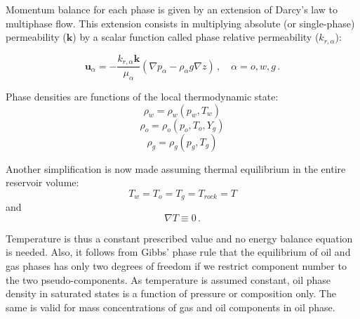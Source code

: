 \documentclass[authoryear,preprint,review,12pt]{elsarticle}
\begin{document}
%

Momentum balance for each phase is given by an extension of Darcy's law to multiphase flow. This extension consists in multiplying absolute (or single-phase) permeability ($\mathbf{k}$) by a scalar function called phase relative permeability ($k_{r,\alpha}$):

\begin{equation}\label{eq: exdarcy}
\mathbf{u}_\alpha = -\frac{k_{r,\alpha} \mathbf{k}}{\mu_\alpha} \left(\nabla p_\alpha - \rho_\alpha g\nabla z\right) \, , \quad \alpha=o,w,g \, .
\end{equation}

Phase densities are functions of the local thermodynamic state:
\begin{equation}
\rho_w = \rho_w \left(p_w, T_w\right)
\end{equation}
\begin{equation}
\rho_o = \rho_o \left(p_o, T_o,Y_g\right)
\end{equation}
\begin{equation}
\rho_g = \rho_g \left(p_g, T_g\right)
\end{equation}

Another simplification is now made assuming thermal equilibrium in the entire reservoir volume:
\begin{equation}
T_w = T_o = T_g = T_{rock} = T
\end{equation}
and
\begin{equation}
\nabla T \equiv 0 \, .
\end{equation}

Temperature is thus a constant prescribed value and no energy balance equation is needed. Also, it follows from Gibbs' phase rule that the equilibrium of oil and gas phases has only two degrees of freedom if we restrict component number to the two pseudo-components. As temperature is assumed constant, oil phase density in saturated states is a function of pressure or composition only. The same is valid for mass concentrations of gas and oil components in oil phase.
\end{document}
